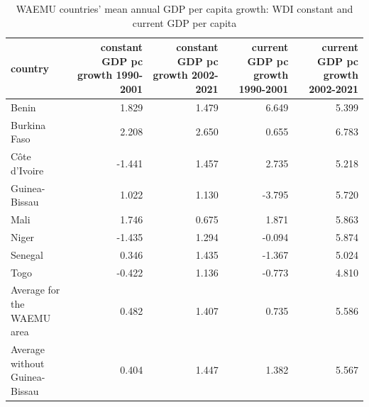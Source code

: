 \begin{table}

\caption{WAEMU countries' mean annual GDP per capita growth: WDI constant and current GDP per capita}
\centering
\begin{tabular}[t]{lrrrr}
\toprule
country & constant GDP pc growth 1990-2001 & constant GDP pc growth 2002-2021 & current GDP pc growth 1990-2001 & current GDP pc growth 2002-2021\\
\midrule
Benin & 1.829 & 1.479 & 6.649 & 5.399\\
Burkina Faso & 2.208 & 2.650 & 0.655 & 6.783\\
Côte d'Ivoire & -1.441 & 1.457 & 2.735 & 5.218\\
Guinea-Bissau & 1.022 & 1.130 & -3.795 & 5.720\\
Mali & 1.746 & 0.675 & 1.871 & 5.863\\
\addlinespace
Niger & -1.435 & 1.294 & -0.094 & 5.874\\
Senegal & 0.346 & 1.435 & -1.367 & 5.024\\
Togo & -0.422 & 1.136 & -0.773 & 4.810\\
Average for the WAEMU area & 0.482 & 1.407 & 0.735 & 5.586\\
Average without Guinea-Bissau & 0.404 & 1.447 & 1.382 & 5.567\\
\bottomrule
\end{tabular}
\end{table}